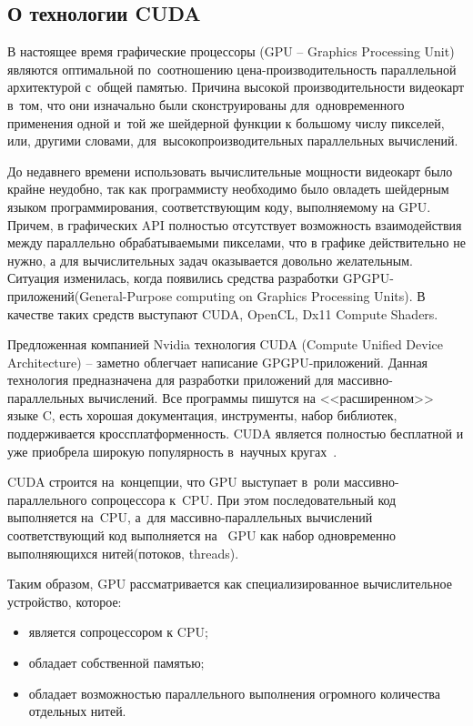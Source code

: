 \subsection{О технологии CUDA}
В настоящее время графические процессоры (GPU -- Graphics Processing Unit)
являются оптимальной по~соотношению цена-производительность параллельной 
архитектурой с~общей памятью. Причина высокой производительности видеокарт 
в~том, что они изначально были сконструированы для~одновременного применения
одной и~той же шейдерной функции к большому числу пикселей, или, другими 
словами, для~высокопроизводительных параллельных вычислений.

До недавнего времени использовать вычислительные мощности видеокарт было
крайне неудобно, так как программисту необходимо было
овладеть шейдерным языком программирования, соответствующим коду,
выполняемому на GPU. Причем, в графических API полностью отсутствует
возможность взаимодействия между параллельно обрабатываемыми пикселами,
что в графике действительно не нужно, а для вычислительных задач оказывается довольно
желательным. Ситуация изменилась, когда появились средства разработки
GPGPU-приложений(General-Purpose computing on Graphics Processing Units). 
В качестве таких средств выступают CUDA, OpenCL, Dx11 Compute
Shaders. 

Предложенная компанией Nvidia технология CUDA (Compute Unified Device Architecture) -- 
заметно облегчает написание GPGPU-приложений. Данная технология предназначена для
разработки приложений для массивно-параллельных вычислений. Все программы пишутся на
<<расширенном>> языке C, есть хорошая документация, инструменты, набор библиотек,
поддерживается кроссплатформенность. CUDA является полностью бесплатной и уже 
приобрела широкую популярность в~научных кругах~\cite{Boreskov}.

CUDA строится на~концепции, что GPU выступает в~роли массивно-параллельного
сопроцессора к~CPU. При этом последовательный код выполняется на~CPU,
а~для массивно-параллельных вычислений соответствующий код выполняется на~
GPU как набор одновременно выполняющихся нитей(потоков, threads).

Таким образом, GPU рассматривается как специализированное вычислительное устройство,
которое:
\begin{itemize}
  \item является сопроцессором к CPU;
  \item обладает собственной памятью;
  \item обладает возможностью параллельного выполнения огромного количества отдельных
  нитей.
\end{itemize}

